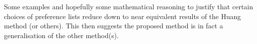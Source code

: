 Some examples and hopefully some mathematical reasoning to justify that certain
choices of preference lists reduce down to near equivalent results of the Huang
method (or others). This then suggests the proposed method is in fact a
generalisation of the other method(s).


